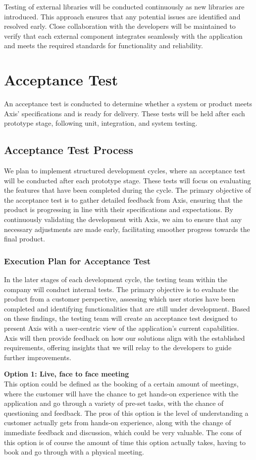 \documentclass{article}
\begin{document}
Testing of external libraries will be conducted continuously as new libraries are introduced. This approach ensures that any potential issues are identified and resolved early. Close collaboration with the developers will be maintained to verify that each external component integrates seamlessly with the application and meets the required standards for functionality and reliability.


\section{Acceptance Test}
An acceptance test is conducted to determine whether a system or product meets Axis' specifications and is ready for delivery. These tests will be held after each prototype stage, following unit, integration, and system testing.


\subsection{Acceptance Test Process}
We plan to implement structured development cycles, where an acceptance test will be conducted after each prototype stage. These tests will focus on evaluating the features that have been completed during the cycle. The primary objective of the acceptance test is to gather detailed feedback from Axis, ensuring that the product is progressing in line with their specifications and expectations. By continuously validating the development with Axis, we aim to ensure that any necessary adjustments are made early, facilitating smoother progress towards the final product.


\subsubsection{Execution Plan for Acceptance Test}
In the later stages of each development cycle, the testing team within the company will conduct internal tests. The primary objective is to evaluate the product from a customer perspective, assessing which user stories have been completed and identifying functionalities that are still under development. Based on these findings, the testing team will create an acceptance test designed to present Axis with a user-centric view of the application's current capabilities. Axis will then provide feedback on how our solutions align with the established requirements, offering insights that we will relay to the developers to guide further improvements.

\textbf{Option 1: Live, face to face meeting}\\
This option could be defined as the booking of a certain amount of meetings, where the customer will have the chance to get hands-on experience with the application and go through a variety of pre-set tasks, with the chance of questioning and feedback. The pros of this option is the level of understanding a customer actually gets from hands-on experience, along with the change of immediate feedback and discussion, which could be very valuable. The cons of this option is of course the amount of time this option actually takes, having to book and go through with a physical meeting.
\end{document}
